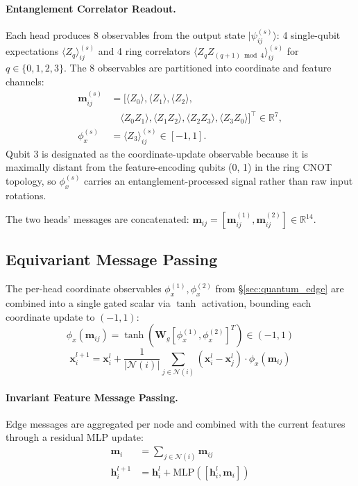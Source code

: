 \documentclass[10pt,twocolumn,letterpaper]{article}
\begin{document}
\paragraph{Entanglement Correlator Readout.}
Each head produces 8 observables from the output state $|\psi_{ij}^{(s)}\rangle$: 4 single-qubit expectations $\langle Z_q \rangle_{ij}^{(s)}$ and 4 ring correlators $\langle Z_q Z_{(q+1)\bmod 4} \rangle_{ij}^{(s)}$ for $q \in \{0, 1, 2, 3\}$. The 8 observables are partitioned into coordinate and feature channels:
\begin{align}
    \mathbf{m}_{ij}^{(s)} &= \big[\langle Z_0 \rangle, \langle Z_1 \rangle, \langle Z_2 \rangle, \nonumber \\
    &\quad \langle Z_0 Z_1 \rangle, \langle Z_1 Z_2 \rangle, \langle Z_2 Z_3 \rangle, \langle Z_3 Z_0 \rangle\big]^\top \in \mathbb{R}^7, \\
    \phi_x^{(s)} &= \langle Z_3 \rangle_{ij}^{(s)} \in [-1, 1].
\end{align}
Qubit 3 is designated as the coordinate-update observable because it is maximally distant from the feature-encoding qubits (0, 1) in the ring CNOT topology, so $\phi_x^{(s)}$ carries an entanglement-processed signal rather than raw input rotations.

The two heads' messages are concatenated: $\mathbf{m}_{ij} = [\mathbf{m}_{ij}^{(1)}, \mathbf{m}_{ij}^{(2)}] \in \mathbb{R}^{14}$.

\subsection{Equivariant Message Passing}
\label{sec:message_passing}

The per-head coordinate observables $\phi_x^{(1)}, \phi_x^{(2)}$ from \S\ref{sec:quantum_edge} are combined into a single gated scalar via $\tanh$ activation, bounding each coordinate update to $(-1, 1)$:
\begin{equation}
    \phi_x(\mathbf{m}_{ij}) = \tanh\!\left(\mathbf{W}_g \left[\phi_x^{(1)}, \phi_x^{(2)}\right]^T\right) \in (-1, 1)
\end{equation}
\begin{equation}
    \mathbf{x}_i^{l+1} = \mathbf{x}_i^l + \frac{1}{|\mathcal{N}(i)|} \sum_{j \in \mathcal{N}(i)} (\mathbf{x}_i^l - \mathbf{x}_j^l) \cdot \phi_x(\mathbf{m}_{ij})
    \label{eq:coord_update}
\end{equation}

\paragraph{Invariant Feature Message Passing.}
Edge messages are aggregated per node and combined with the current features through a residual MLP update:
\begin{align}
    \mathbf{m}_i &= \sum_{j \in \mathcal{N}(i)} \mathbf{m}_{ij} \\
    \mathbf{h}_i^{l+1} &= \mathbf{h}_i^l + \mathrm{MLP}\left([\mathbf{h}_i^l, \mathbf{m}_i]\right)
    \label{eq:feat_update}
\end{align}
\end{document}
